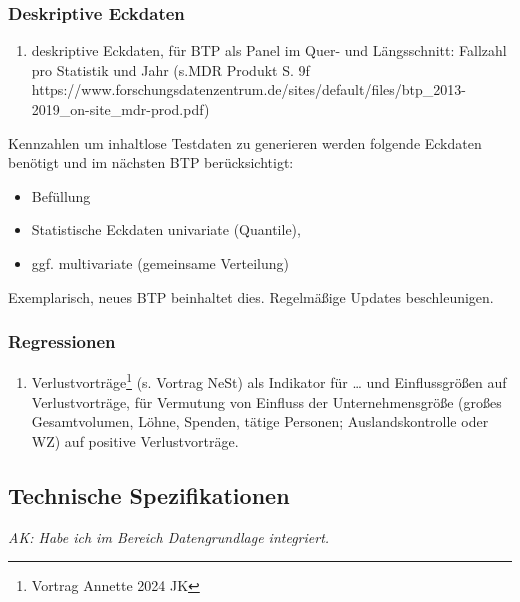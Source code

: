 \documentclass[
  german,
  10pt,
  twoside]{article}
\providecommand{\tightlist}{%
  \setlength{\itemsep}{0pt}\setlength{\parskip}{0pt}}
\begin{document}
\subsubsection{Deskriptive Eckdaten}\label{deskriptive-eckdaten}

\begin{enumerate}
\def\labelenumi{\arabic{enumi}.}
\tightlist
\item
  deskriptive Eckdaten, für BTP als Panel im Quer- und Längsschnitt:
  Fallzahl pro Statistik und Jahr (s.MDR Produkt S. 9f
  https://www.forschungsdatenzentrum.de/sites/default/files/btp\_2013-2019\_on-site\_mdr-prod.pdf)
\end{enumerate}

Kennzahlen um inhaltlose Testdaten zu generieren werden folgende
Eckdaten benötigt und im nächsten BTP berücksichtigt:

\begin{itemize}
\tightlist
\item
  Befüllung
\item
  Statistische Eckdaten univariate (Quantile),
\item
  ggf. multivariate (gemeinsame Verteilung)
\end{itemize}

Exemplarisch, neues BTP beinhaltet dies. Regelmäßige Updates
beschleunigen.

\subsubsection{Regressionen}\label{regressionen}

\begin{enumerate}
\def\labelenumi{\arabic{enumi}.}
\setcounter{enumi}{1}
\tightlist
\item
  Verlustvorträge\footnote{Vortrag Annette 2024 JK} (s. Vortrag NeSt)
  als Indikator für \ldots{} und Einflussgrößen auf Verlustvorträge, für
  Vermutung von Einfluss der Unternehmensgröße (großes Gesamtvolumen,
  Löhne, Spenden, tätige Personen; Auslandskontrolle oder WZ) auf
  positive Verlustvorträge.
\end{enumerate}

\subsection{Technische
Spezifikationen}\label{technische-spezifikationen}

\emph{AK: Habe ich im Bereich Datengrundlage integriert. }
\end{document}
